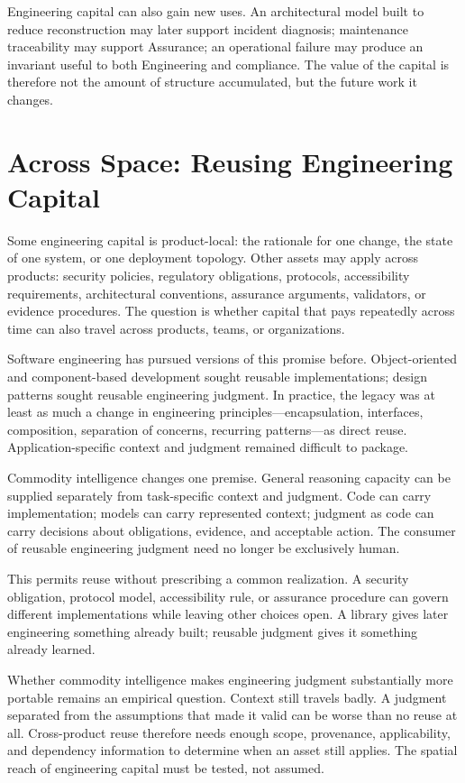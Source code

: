 Engineering capital can also gain new uses. An architectural model built to reduce reconstruction may later support incident diagnosis; maintenance traceability may support Assurance; an operational failure may produce an invariant useful to both Engineering and compliance. The value of the capital is therefore not the amount of structure accumulated, but the future work it changes.

\section{Across Space: Reusing Engineering Capital}\label{heading:across-space-reusing-engineering-capital}

Some engineering capital is product-local: the rationale for one change, the state of one system, or one deployment topology. Other assets may apply across products: security policies, regulatory obligations, protocols, accessibility requirements, architectural conventions, assurance arguments, validators, or evidence procedures. The question is whether capital that pays repeatedly across time can also travel across products, teams, or organizations.

Software engineering has pursued versions of this promise before. Object-oriented and component-based development sought reusable implementations; design patterns sought reusable engineering judgment. In practice, the legacy was at least as much a change in engineering principles---encapsulation, interfaces, composition, separation of concerns, recurring patterns---as direct reuse. Application-specific context and judgment remained difficult to package.

Commodity intelligence changes one premise. General reasoning capacity can be supplied separately from task-specific context and judgment. Code can carry implementation; models can carry represented context; judgment as code can carry decisions about obligations, evidence, and acceptable action. The consumer of reusable engineering judgment need no longer be exclusively human.

This permits reuse without prescribing a common realization. A security obligation, protocol model, accessibility rule, or assurance procedure can govern different implementations while leaving other choices open. A library gives later engineering something already built; reusable judgment gives it something already learned.

Whether commodity intelligence makes engineering judgment substantially more portable remains an empirical question. Context still travels badly. A judgment separated from the assumptions that made it valid can be worse than no reuse at all. Cross-product reuse therefore needs enough scope, provenance, applicability, and dependency information to determine when an asset still applies. The spatial reach of engineering capital must be tested, not assumed.

